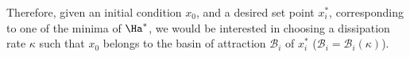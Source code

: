 {\color{red}
Therefore, given an initial condition $x_0$, and a desired set point $x_i^*$, corresponding to one of the minima of $\Ha^*$, we would be interested in choosing a dissipation rate $\kappa$ such that $x_0$ 
belongs to the basin of attraction $\mathcal{B}_i$ of $x_i^*$ ($\mathcal{B}_i = \mathcal{B}_i(\kappa)$). 
}
